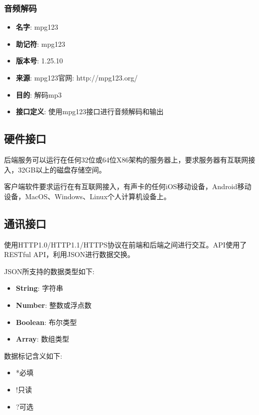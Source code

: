 \begin{enumerate}
\subsubsection{音频解码}
\begin{itemize}
	\item \textbf{名字}: 
	mpg123
	\item \textbf{助记符}: 
	mpg123
	\item \textbf{版本号}: 
	1.25.10
	\item \textbf{来源}: 
	mpg123官网: http://mpg123.org/
	\item \textbf{目的}: 
	解码mp3
	\item \textbf{接口定义}: 
	使用mpg123接口进行音频解码和输出
\end{itemize}

\subsection{硬件接口}

后端服务可以运行在任何32位或64位X86架构的服务器上，要求服务器有互联网接入，32GB以上的磁盘存储空间。

客户端软件要求运行在有互联网接入，有声卡的任何iOS移动设备，Android移动设备，MacOS、Windows、Linux个人计算机设备上。


\subsection{通讯接口}

使用HTTP1.0/HTTP1.1/HTTPS协议在前端和后端之间进行交互。API使用了RESTful API，利用JSON进行数据交换。

JSON所支持的数据类型如下: 
\begin{itemize}
	\item \textbf{String}: 字符串
	\item \textbf{Number}: 整数或浮点数
	\item \textbf{Boolean}: 布尔类型
	\item \textbf{Array}: 数组类型
\end{itemize}

数据标记含义如下:
\begin{itemize}
	\item *必填
	\item !只读
	\item ?可选
\end{itemize}


\end{enumerate}
